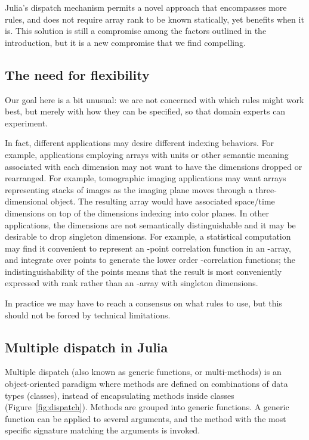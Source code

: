 \documentclass[preprint]{sigplanconf}
\begin{document}
Julia's dispatch mechanism permits a novel approach that encompasses more
rules, and does not require array rank to be known statically, yet
benefits when it is.
This solution is still a compromise among the factors outlined in
the introduction, but it is a new compromise that we find compelling.





\subsection{The need for flexibility}

Our goal here is a bit unusual: we are not concerned with which rules might
work best, but merely with how they can be specified, so that domain experts
can experiment.

In fact, different applications may desire different indexing behaviors. For
example, applications employing arrays with units or other semantic meaning
associated with each dimension may not want to have the dimensions dropped or
rearranged. For example, tomographic imaging applications may want arrays
representing stacks of images as the imaging plane moves through a three-
dimensional object. The resulting array would have associated space/time
dimensions on top of the dimensions indexing into color planes. In
other applications, the dimensions are not semantically distinguishable and it
may be desirable to drop singleton dimensions. For example, a statistical
computation may find it convenient to represent an -point correlation
function in an -array, and integrate over  points to generate the lower
order -correlation functions; the indistinguishability of the points
means that the result is most conveniently expressed with rank 
rather than an -array with  singleton dimensions.



In practice we may have to reach a consensus on what rules to use, but this
should not be forced by technical limitations.

\subsection{Multiple dispatch in Julia}

Multiple dispatch (also known as generic functions, or multi-methods) is an
object-oriented paradigm where methods are defined on combinations of data
types (classes), instead of encapsulating methods inside classes
(Figure~\ref{fig:dispatch}). Methods are
grouped into generic functions. A generic function can be applied to several
arguments, and the method with the most specific signature matching the
arguments is invoked.
\end{document}
